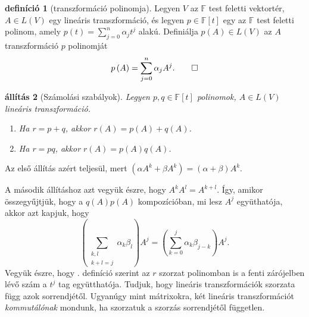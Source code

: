 \documentclass[9pt, a4paper, showtrims]{memoir}
\makeatletter
\renewenvironment{proof}[1][\proofname]
    {\par\pushQED{\qed}%
    \normalfont \topsep6\p@\@plus6\p@\relax
    \trivlist
    \item[\hskip\labelsep
        \itshape
    #1\@addpunct{:}]\ignorespaces}
    {\popQED\endtrivlist\@endpefalse}
\theoremstyle{plain}
\newtheorem{proposition}{állítás}[chapter]
\theoremstyle{remark}
\theoremstyle{definition}
\newtheorem{definition}[proposition]{definíció}
\makeatother
\begin{document}
    \begin{definition}[transzformáció polinomja]
        Legyen $V$ az $\mathbb{F}$ test feletti vektortér,
        $A\in L\left( V \right)$ egy lineáris transzformáció, és
        legyen $p\in\mathbb{F}\left[t \right]$ egy az $\mathbb{F}$ test feletti 
        polinom,
        amely $p\left( t \right)=
        \sum_{j=0}^n\alpha_jt^j$
        alakú.
        Definiálja $p\left( A \right)\in L\left( V \right)$
        az $A$ transzformáció $p$ polinomját
        \[
            p\left( A \right)
            =
            \sum_{j=0}^n\alpha_jA^j.\qedhere
        \]
    \end{definition}
    \begin{proposition}[Számolási szabályok]
        Legyen $p,q\in\mathbb{F}\left[ t \right]$ polinomok,
        $A\in L\left( V \right)$ lineáris transzformáció.
        \begin{enumerate}
            \item Ha $r=p+q$, akkor $r\left( A \right)=p\left( A \right)+q\left( A \right)$.
            \item Ha $r=pq$, akkor $r\left( A \right)=p\left( A \right)q\left( A \right)$.\qedhere
        \end{enumerate}
    \end{proposition}
    \begin{proof}
        Az első állítás azért teljesül, mert
        \(
        \left( \alpha A^k+\beta A^k \right)
        =
        \left( \alpha+\beta \right)A^k.
        \)

        A második állításhoz azt vegyük észre, hogy
        \(
        A^kA^l=A^{k+l}.
        \)
        Így, amikor összegyűjtjük, hogy a $q\left( A \right)p\left( A \right)$
        kompozícióban, mi lesz $A^j$ együthatója, 
        akkor azt kapjuk,
        hogy 
        \begin{displaymath}
            \left( \sum_{\substack{k,l\\k+l=j}}\alpha_k\beta_l \right)A^j
            =
            \left( \sum_{k=0}^j\alpha_k\beta_{j-k} \right)A^j.
        \end{displaymath}
        Vegyük észre, hogy . definíció szerint az
        $r$ szorzat polinomban is a fenti zárójelben lévő szám a 
        $t^j$ tag együtthatója.
    \end{proof}
    Tudjuk, hogy lineáris transzformációk szorzata függ azok sorrendjétől.
    Ugyanúgy mint mátrixokra, két lineáris transzformációt \emph{kommutálónak}
    mondunk, ha szorzatuk a szorzás sorrendjétől független.
\end{document}
